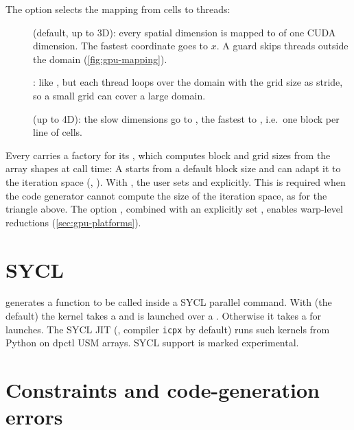 The  option selects the mapping from cells to threads:
\begin{description}
  \item[] (default, up to 3D): every spatial dimension is mapped to
         of one CUDA dimension. The fastest
        coordinate goes to $x$. A guard  skips threads outside the domain
        (\cref{fig:gpu-mapping}).
  \item[]: like , but each thread loops over the
        domain with the grid size as stride, so a small grid can cover a large domain.
  \item[] (up to 4D): the slow dimensions go to , the
        fastest to , i.e.\ one block per line of cells.
\end{description}
Every  carries a factory for its , which
computes block and grid sizes from the array shapes at call time:
A  starts from a default block size and can
adapt it to the iteration space (, ). With
, the user sets  and
 explicitly. This is required when the code generator cannot compute
the size of the iteration space, as for the triangle above.
The option , combined with an explicitly set
, enables warp-level reductions (\cref{sec:gpu-platforms}).

\section{SYCL}
 generates a function to be called inside a SYCL parallel
command. With  (the default) the kernel takes a
 and is launched over a . Otherwise it takes a
 for  launches. The SYCL JIT (,
compiler \texttt{icpx} by default) runs such kernels from Python on dpctl USM arrays.
SYCL support is marked experimental.

\section{Constraints and code-generation errors}\label{sec:constraints}

